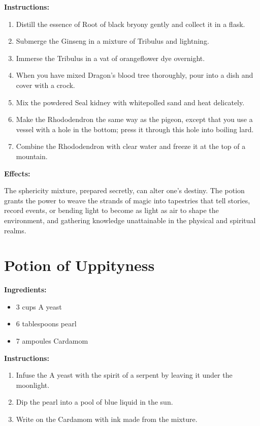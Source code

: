 \documentclass{article}
\begin{document}
\textbf{Instructions:}

\begin{enumerate}
  \item Distill the essence of Root of black bryony gently and collect it in a flask.
  \item Submerge the Ginseng in a mixture of Tribulus and lightning.
  \item Immerse the Tribulus in a vat of orangeflower dye overnight.
  \item When you have mixed Dragon's blood tree thoroughly, pour into a dish and cover with a crock.
  \item Mix the powdered Seal kidney with whitepolled sand and heat delicately.
  \item Make the Rhododendron the same way as the pigeon, except that you use a vessel with a hole in the bottom; press it through this hole into boiling lard.
  \item Combine the Rhododendron with clear water and freeze it at the top of a mountain.
\end{enumerate}

\textbf{Effects:}

The sphericity mixture, prepared secretly, can alter one's destiny. The potion grants the power to weave the strands of magic into tapestries that tell stories, record events, or bending light to become as light as air to shape the environment, and gathering knowledge unattainable in the physical and spiritual realms.

\newpage
\section*{Potion of Uppityness}

\textbf{Ingredients:}

\begin{itemize}
  \item 3 cups A yeast
  \item 6 tablespoons pearl
  \item 7 ampoules Cardamom
\end{itemize}

\textbf{Instructions:}

\begin{enumerate}
  \item Infuse the A yeast with the spirit of a serpent by leaving it under the moonlight.
  \item Dip the pearl into a pool of blue liquid in the sun.
  \item Write on the Cardamom with ink made from the mixture.
\end{enumerate}
\end{document}
